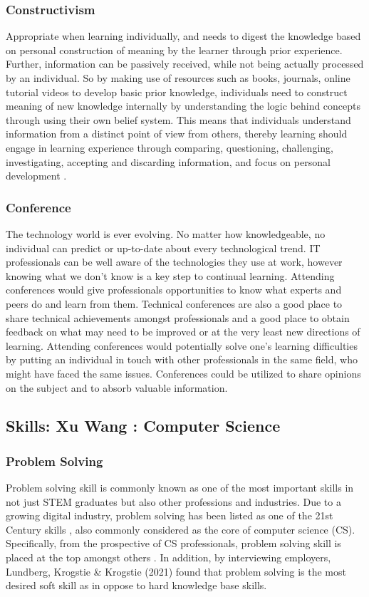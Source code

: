 \documentclass[a4paper, 11pt]{report}
\begin{document}
\subsubsection{Constructivism}
 Appropriate when learning individually, and needs to digest the knowledge based on personal construction of meaning by the learner through prior experience. Further, information can be passively received, while not being actually processed by an individual. So by making use of resources such as books, journals, online tutorial videos to develop basic prior knowledge, individuals need to construct meaning of new knowledge internally by understanding the logic behind concepts through using their own belief system. This means that individuals understand information from a distinct point of view from others, thereby learning should engage in learning experience through comparing, questioning, challenging, investigating, accepting and discarding information, and focus on personal development \cite{cooperstein2004beyond}.

 
\subsubsection{Conference}
The technology world is ever evolving. No matter how knowledgeable, no individual can predict or up-to-date about every technological trend. IT professionals can be well aware of the technologies they use at work, however knowing what we don’t know is a key step to continual learning. Attending conferences would give professionals opportunities to know what experts and peers do and learn from them. Technical conferences are also a good place to share technical achievements amongst professionals and a good place to obtain feedback on what may need to be improved or at the very least new directions of learning. Attending conferences would potentially solve one’s learning difficulties by putting an individual in touch with other professionals in the same field, who might have faced the same issues. Conferences could be utilized to share opinions on the subject and to absorb valuable information.



\subsection{Skills: Xu Wang : Computer Science}

\subsubsection{Problem Solving}
Problem solving skill is commonly known as one of the most important skills in not just STEM graduates but also other professions and industries. Due to a growing digital industry, problem solving has been listed as one of the 21st Century skills \cite{voogt201021st}, also commonly considered as the core of computer science (CS). Specifically, from the prospective of CS professionals, problem solving skill is placed at the top amongst others \cite{exter2018comparing}. In addition, by interviewing employers, Lundberg, Krogstie \& Krogstie (2021) found that problem solving is the most desired soft skill as in oppose to hard knowledge base skills.
\end{document}
